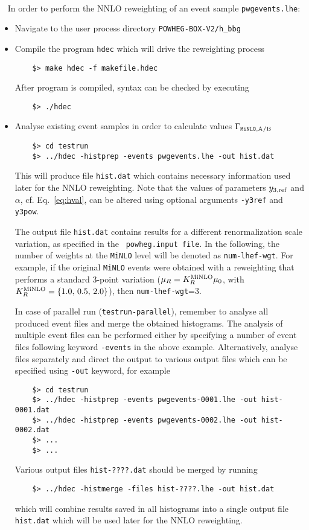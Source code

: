 \documentclass[11pt,a4paper]{article}\pdfoutput=1
\newcommand{\POWHEGBOXVTWO}{{\tt{POWHEG-BOX-V2}}}
\newcommand{\MINLO}{{\tt{MiNLO}}}
\newcommand{\hbbg}{{\tt{h\_bbg}}}
\begin{document}
~\\~
\noindent
In order to perform the NNLO reweighting of an event sample {\tt{pwgevents.lhe}}:
\begin{itemize}
  \renewcommand{\labelitemi}{$\rightarrow$}
\item Navigate to the user process directory \POWHEGBOXVTWO{}{\tt{/}}\hbbg{}
\item Compile the program {\tt{hdec}} which will drive the reweighting process
  \begin{lstlisting}
    $> make hdec -f makefile.hdec
  \end{lstlisting}
  After program is compiled, syntax can be checked by executing
  \begin{lstlisting}
    $> ./hdec
  \end{lstlisting}
\item Analyse existing event samples in order to calculate values
  $\Gamma_{\MINLO{},\rm{A/B}}$
  \begin{lstlisting}
    $> cd testrun
    $> ../hdec -histprep -events pwgevents.lhe -out hist.dat
  \end{lstlisting}
  This will produce file {\tt{hist.dat}} which contains necessary
  information used later for the NNLO reweighting. Note that the
  values of parameters $y_{3,\rm{ref}}$ and $\alpha$,
  cf. Eq.~\eqref{eq:hval}, can be altered using optional arguments
  {\tt{-y3ref}} and {\tt{y3pow}}.

  The output file {\tt{hist.dat}} contains results for a different
  renormalization scale variation, as specified in the {\tt
    powheg.input file}.  In the following, the number of weights at
  the \MINLO{} level will be denoted as {\tt num-lhef-wgt}. For
  example, if the original \MINLO{} events were obtained with a
  reweighting that performs a standard 3-point variation ($\mu_R =
  K_R^{\rm{MiNLO}} \mu_0$, with $K_R^{\rm{MiNLO}}=\{1.0,\, 0.5,\,
  2.0\}$), then {\tt num-lhef-wgt}=3.
  
  In case of parallel run ({\tt{testrun-parallel}}), remember to
  analyse all produced event files and merge the obtained histograms.
  The analysis of multiple event files can be performed either by
  specifying a number of event files following keyword {\tt{-events}}
  in the above example. Alternatively, analyse files separately and
  direct the output to various output files which can be specified
  using {\tt{-out}} keyword, for example
  \begin{lstlisting}
    $> cd testrun
    $> ../hdec -histprep -events pwgevents-0001.lhe -out hist-0001.dat
    $> ../hdec -histprep -events pwgevents-0002.lhe -out hist-0002.dat
    $> ...
    $> ...
  \end{lstlisting}
  Various output files {\tt{hist-????.dat}} should be merged by running
  \begin{lstlisting}
    $> ../hdec -histmerge -files hist-????.lhe -out hist.dat
  \end{lstlisting}
  which will combine results saved in all histograms into a single
  output file {\tt{hist.dat}} which will be used later for the NNLO
  reweighting.


\end{itemize}
\end{document}
